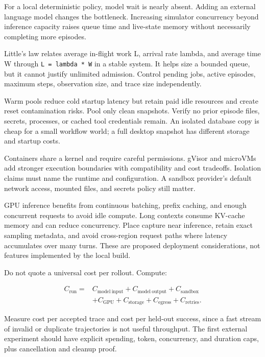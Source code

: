 \documentclass[
  11pt,
  letterpaper,
]{article}
\begin{document}
For a local deterministic policy, model wait is nearly absent. Adding an
external language model changes the bottleneck. Increasing simulator
concurrency beyond inference capacity raises queue time and live-state
memory without necessarily completing more episodes.

Little's law relates average in-flight work L, arrival rate lambda, and
average time W through \texttt{L\ =\ lambda\ *\ W} in a stable system.
It helps size a bounded queue, but it cannot justify unlimited
admission. Control pending jobs, active episodes, maximum steps,
observation size, and trace size independently.

Warm pools reduce cold startup latency but retain paid idle resources
and create reset contamination risks. Pool only clean snapshots. Verify
no prior episode files, secrets, processes, or cached tool credentials
remain. An isolated database copy is cheap for a small workflow world; a
full desktop snapshot has different storage and startup costs.

Containers share a kernel and require careful permissions. gVisor and
microVMs add stronger execution boundaries with compatibility and cost
tradeoffs. Isolation claims must name the runtime and configuration. A
sandbox provider's default network access, mounted files, and secrets
policy still matter.

GPU inference benefits from continuous batching, prefix caching, and
enough concurrent requests to avoid idle compute. Long contexts consume
KV-cache memory and can reduce concurrency. Place capture near
inference, retain exact sampling metadata, and avoid cross-region
request paths where latency accumulates over many turns. These are
proposed deployment considerations, not features implemented by the
local build.

Do not quote a universal cost per rollout. Compute:

\[\begin{aligned}
C_{\mathrm{run}}={}&C_{\mathrm{model\ input}}+C_{\mathrm{model\ output}}+C_{\mathrm{sandbox}}\\
&+C_{\mathrm{GPU}}+C_{\mathrm{storage}}+C_{\mathrm{egress}}+C_{\mathrm{retries}}.
\end{aligned}\]

Measure cost per accepted trace and cost per held-out success, since a
fast stream of invalid or duplicate trajectories is not useful
throughput. The first external experiment should have explicit spending,
token, concurrency, and duration caps, plus cancellation and cleanup
proof.
\end{document}
